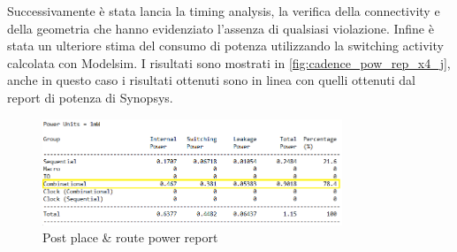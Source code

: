 Successivamente è stata lancia la timing analysis, la verifica della connectivity e della geometria che hanno evidenziato l'assenza di qualsiasi violazione. Infine è stata un ulteriore stima del consumo di potenza utilizzando la switching activity calcolata con Modelsim. I risultati sono mostrati in \autoref{fig:cadence_pow_rep_x4_j}, anche in questo caso i risultati ottenuti sono in linea con quelli ottenuti dal report di potenza di Synopsys.

\begin{figure}[h]
	\center
	\includegraphics[width=0.8\textwidth]{images/rep_power_x4_cadence_j_mod.png}
	\caption{Post place \& route power report}
	\label{fig:cadence_pow_rep_x4_j}
\end{figure}

